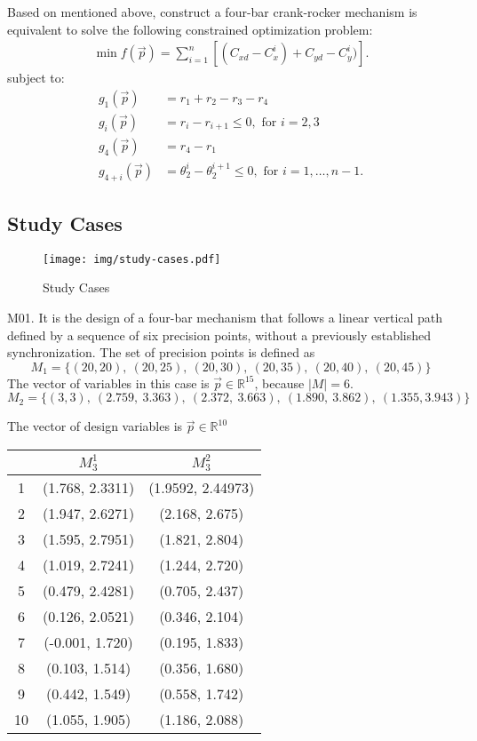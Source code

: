 \documentclass[12pt,letterpape]{article}
\begin{document}
Based on mentioned above, construct a four-bar crank-rocker mechanism is equivalent to solve the following constrained optimization problem:
% 
\begin{align}
	\min f(\vec{p}) = \sum_{i=1}^n \left[ (C_{xd} - C_x^i) + C_{yd} - C_y^i) \right].
\end{align}
% 
subject to: 
% 
\begin{align*}
 g_1( \vec{p})  & = r_1 + r_2 - r_3 - r_4 \\
 g_i(\vec{p})   & = r_i -  r_{i+1} \leq 0, \text{ for } i = 2, 3 \\
 g_4(\vec{p})   & = r_4 - r_1 \\
 g_{4 + i } (\vec{p})   & = \theta_{2}^i - \theta_{2}^{i+1} \leq 0,  \text{ for } i = 1, \ldots, n-1. 
\end{align*}
%

\subsection{Study Cases} %
\label{sub:study_cases}

\begin{figure}[!ht]
	\centering
	\texttt{[image: img/study-cases.pdf]}
	\caption{Study Cases}
	\label{fig:studycases}
\end{figure}

M01. It is the design of a four-bar mechanism that follows a linear vertical path
defined by a sequence of six precision points, without a previously established
synchronization. The set of precision points is defined as
% 
$$
	M_{1} = \{ (20, 20),\ (20, 25),\ (20, 30),\ (20, 35),\ (20, 40),\ (20, 45) \}
$$
The vector of variables in this case is $ \vec{p} \in \mathbb{R}^{15} $, because
$|M| = 6$. 
%
$$
	M_{2} = \{(3, 3),\ (2.759,\ 3.363),\ (2.372,\ 3.663),\ (1.890,\ 3.862),\ (1.355, 3.943) \}
$$

The vector of design variables is $ \vec{p} \in \mathbb{R}^{10} $

\begin{table}[!ht]
	\centering
	\begin{tabular}{ccc}
			\hline
			  &    $M_{3}^1$    &    $M_{3}^2$      \\
			\hline
			1 & (1.768, 2.3311) & (1.9592, 2.44973) \\
			2 & (1.947, 2.6271) & (2.168, 2.675)    \\
			3 & (1.595, 2.7951) & (1.821, 2.804)    \\
			4 & (1.019, 2.7241) & (1.244, 2.720)    \\
			5 & (0.479, 2.4281) & (0.705, 2.437)    \\
			6 & (0.126, 2.0521) & (0.346, 2.104)    \\
			7 & (-0.001, 1.720) & (0.195, 1.833)    \\
			8 & (0.103, 1.514)  & (0.356, 1.680)    \\
			9 & (0.442, 1.549)  & (0.558, 1.742)    \\
		   10 & (1.055, 1.905)  & (1.186, 2.088)    \\
			\hline
	\end{tabular}
\end{table}
\end{document}
